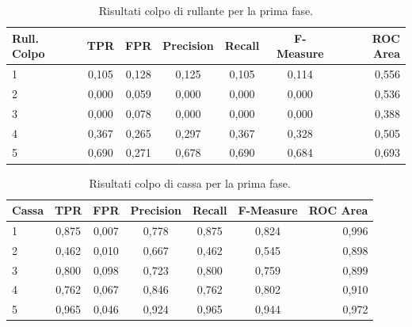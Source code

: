\begin{table}[h!]
	\begin{center}
		\begin{tabular}{l|c|c|c|c|c|r} %
			\textbf{Rull. Colpo} & \textbf{TPR} & \textbf{FPR} & \textbf{Precision} & \textbf{Recall} & \textbf{F-Measure} & \textbf{ROC Area}\\
			\hline
			1 & 0,105 & 0,128 & 0,125 & 0,105 & 0,114 & 0,556 \\
			2 & 0,000 & 0,059 & 0,000 & 0,000 & 0,000 & 0,536 \\
			3 & 0,000 & 0,078 & 0,000 & 0,000 & 0,000 & 0,388 \\
			4 & 0,367 & 0,265 & 0,297 & 0,367 & 0,328 & 0,505 \\
			5 & 0,690 & 0,271 & 0,678 & 0,690 & 0,684 & 0,693 \\
		\end{tabular}
		\caption{Risultati colpo di rullante per la prima fase.}
		\label{tab:sn_hit_res_2}
	\end{center}
\end{table}

\begin{table}[h!]
	\begin{center}
		\begin{tabular}{l|c|c|c|c|c|r} %
			\textbf{Cassa} & \textbf{TPR} & \textbf{FPR} & \textbf{Precision} & \textbf{Recall} & \textbf{F-Measure} & \textbf{ROC Area}\\
			\hline
			1 & 0,875 & 0,007 & 0,778 & 0,875 & 0,824 & 0,996 \\
			2 & 0,462 & 0,010 & 0,667 & 0,462 & 0,545 & 0,898 \\
			3 & 0,800 & 0,098 & 0,723 & 0,800 & 0,759 & 0,899 \\
			4 & 0,762 & 0,067 & 0,846 & 0,762 & 0,802 & 0,910 \\
			5 & 0,965 & 0,046 & 0,924 & 0,965 & 0,944 & 0,972 \\
		\end{tabular}
		\caption{Risultati colpo di cassa per la prima fase.}
		\label{tab:kick_res_2}
	\end{center}
\end{table}


